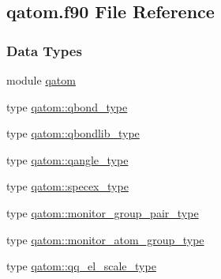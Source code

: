 \hypertarget{qatom_8f90}{\subsection{qatom.\-f90 File Reference}
\label{qatom_8f90}
}
\subsubsection*{Data Types}
\begin{DoxyCompactItemize}
\item 
module \hyperlink{classqatom}{qatom}
\item 
type \hyperlink{structqatom_1_1qbond__type}{qatom\-::qbond\-\_\-type}
\item 
type \hyperlink{structqatom_1_1qbondlib__type}{qatom\-::qbondlib\-\_\-type}
\item 
type \hyperlink{structqatom_1_1qangle__type}{qatom\-::qangle\-\_\-type}
\item 
type \hyperlink{structqatom_1_1specex__type}{qatom\-::specex\-\_\-type}
\item 
type \hyperlink{structqatom_1_1monitor__group__pair__type}{qatom\-::monitor\-\_\-group\-\_\-pair\-\_\-type}
\item 
type \hyperlink{structqatom_1_1monitor__atom__group__type}{qatom\-::monitor\-\_\-atom\-\_\-group\-\_\-type}
\item 
type \hyperlink{structqatom_1_1qq__el__scale__type}{qatom\-::qq\-\_\-el\-\_\-scale\-\_\-type}
\end{DoxyCompactItemize}
